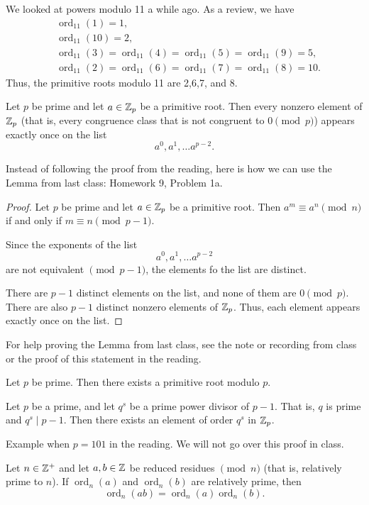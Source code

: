 \documentclass[letterpaper, 11 pt]{article}
\newcommand{\ord}{\operatorname{ord}}
\begin{document}
We looked at powers modulo 11 a while ago.  As a review, we have 
\begin{align*}
& \ord_{11}(1)=1,\\
 &\ord_{11}(10)=2,\\
 &\ord_{11}(3)=\ord_{11}(4)=\ord_{11}(5)=\ord_{11}(9)=5,\\ 
& \ord_{11}(2)=\ord_{11}(6)=\ord_{11}(7)=\ord_{11}(8)=10. 
\end{align*}
Thus, the primitive roots modulo 11 are 2,6,7, and 8.

\begin{thm} 
 Let $p$ be prime and let $a\in\mathbb Z_p$ be a primitive root. Then every nonzero element of $\mathbb Z_p$ (that is, every congruence class that is not congruent to $0\pmod p$) appears exactly once on the list \[a^0, a^1, \dots a^{p-2}.\]
\end{thm}
Instead of following the proof from the reading, here is how we can use the Lemma from last class: Homework 9, Problem 1a.
\begin{proof}
Let $p$ be prime and let $a\in\mathbb Z_p$ be a primitive root. Then $a^m\equiv a^n \pmod n$ if and only if $m\equiv n \pmod{p-1}$.

Since the exponents of the list \[a^0, a^1, \dots a^{p-2}\] are not equivalent $\pmod{p-1}$, the elements fo the list are distinct.

There are $p-1$ distinct elements on the list, and none of them are $0\pmod p$. There are also $p-1$ distinct nonzero elements of $\mathbb Z_p$. Thus, each element appears exactly once on the list.
\end{proof}
For help proving the Lemma from last class, see the note or recording from class or the proof of this statement in the reading.

\begin{thm}
 Let $p$ be prime. Then there exists a primitive root modulo $p$.
\end{thm}

\begin{lem}[Lemma 10.3.4]
 Let $p$ be a prime, and let $q^s$ be a prime power divisor of $p-1$. That is, $q$ is prime and $q^s\mid p-1$. Then there exists an element of order $q^s$ in $\mathbb Z_p$.
\end{lem}
Example when $p=101$ in the reading. We will not go over this proof in class.

\begin{lem}[Lemma 10.3.5]
 Let $n\in \mathbb Z^+$ and let $a,b\in\mathbb Z$ be reduced residues $\pmod n$ (that is, relatively prime to $n$). If $\ord_n(a)$ and $\ord_n(b)$ are relatively prime, then \[\ord_n(ab)=\ord_n(a)\ord_n(b).\]
\end{lem}

\end{document}
